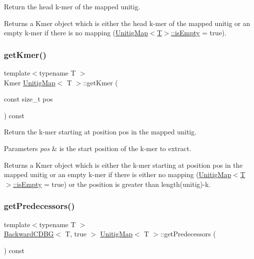 Return the head k-\/mer of the mapped unitig. 

\begin{DoxyReturn}{Returns}
a Kmer object which is either the head k-\/mer of the mapped unitig or an empty k-\/mer if there is no mapping (\hyperlink{structUnitigMap_a152c942911cb2ccf57d4c4c1e3f40178}{Unitig\+Map$<$\+T$>$\+::is\+Empty} = true). 
\end{DoxyReturn}
\mbox{\label{structUnitigMap_a90042b7d8610cd1726b19c3a49e7be26}} 
\subsubsection{\texorpdfstring{get\+Kmer()}{getKmer()}}
{\footnotesize\ttfamily template$<$typename T $>$ \\
Kmer \hyperlink{structUnitigMap}{Unitig\+Map}$<$ T $>$\+::get\+Kmer (\begin{DoxyParamCaption}\item[{const size\+\_\+t}]{pos }\end{DoxyParamCaption}) const}



Return the k-\/mer starting at position pos in the mapped unitig. 


\begin{DoxyParams}{Parameters}
{\em pos} & is the start position of the k-\/mer to extract. \\
\hline
\end{DoxyParams}
\begin{DoxyReturn}{Returns}
a Kmer object which is either the k-\/mer starting at position pos in the mapped unitig or an empty k-\/mer if there is either no mapping (\hyperlink{structUnitigMap_a152c942911cb2ccf57d4c4c1e3f40178}{Unitig\+Map$<$\+T$>$\+::is\+Empty} = true) or the position is greater than length(unitig)-\/k. 
\end{DoxyReturn}
\mbox{\label{structUnitigMap_aed2e39718b72838f4cc813577898a926}} 
\subsubsection{\texorpdfstring{get\+Predecessors()}{getPredecessors()}\hspace{0.1cm}{\footnotesize\ttfamily [1/2]}}
{\footnotesize\ttfamily template$<$typename T $>$ \\
\hyperlink{classBackwardCDBG}{Backward\+C\+D\+BG}$<$ T, true $>$ \hyperlink{structUnitigMap}{Unitig\+Map}$<$ T $>$\+::get\+Predecessors (\begin{DoxyParamCaption}{ }\end{DoxyParamCaption}) const}



